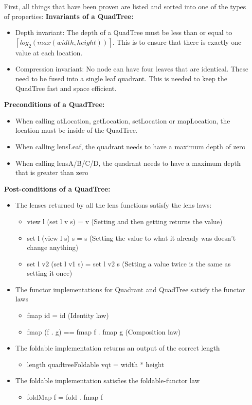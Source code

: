 First, all things that have been proven are listed and sorted into one of the types of properties: \linebreak 
\textbf{Invariants of a QuadTree:}
\begin{itemize}
    \item Depth invariant: The depth of a QuadTree must be less than or equal to $\left \lceil{log_{2}( max(width, height))}\right \rceil$. This is to ensure that there is exactly one value at each location.
    \item Compression invariant: No node can have four leaves that are identical. These need to be fused into a single leaf quadrant. This is needed to keep the QuadTree fast and space efficient.
\end{itemize} 
\textbf{Preconditions of a QuadTree:}
\begin{itemize}
    \item When calling atLocation, getLocation, setLocation or mapLocation, the location must be inside of the QuadTree.
    \item When calling lensLeaf, the quadrant needs to have a maximum depth of zero
    \item When calling lensA/B/C/D, the quadrant needs to have a maximum depth that is greater than zero
\end{itemize} 
\textbf{Post-conditions of a QuadTree:}
\begin{itemize}
    \item The lenses returned by all the lens functions satisfy the lens laws: \cite{lens}
        \begin{itemize}
            \item view l (set l v s) = v (Setting and then getting returns the value)
            \item set l (view l s) s = s (Setting the value to what it already was doesn't change anything)
            \item set l v2 (set l v1 s) = set l v2 s (Setting a value twice is the same as setting it once)
        \end{itemize}
    \item The functor implementations for Quadrant and QuadTree satisfy the functor laws
        \begin{itemize}
            \item fmap id = id (Identity law)
            \item fmap (f . g) == fmap f . fmap g (Composition law)
        \end{itemize}
    \item The foldable implementation returns an output of the correct length
        \begin{itemize}
            \item length quadtreeFoldable vqt = width * height
        \end{itemize}
    \item The foldable implementation satisfies the foldable-functor law
        \begin{itemize}
            \item foldMap f = fold . fmap f
        \end{itemize}
\end{itemize}

